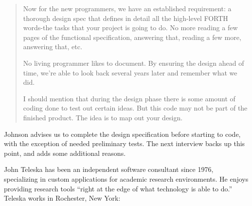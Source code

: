 \begin{quotation}
\noindent Now for the new programmers, we have an established requirement: a
thorough design spec that defines in detail all the high-level FORTH
words-the tasks that your project is going to do. No more reading a few
pages of the functional specification, answering that, reading a few more,
answering that, etc.

\noindent No living programmer likes to document. By ensuring the design ahead of
time, we're able to look back several years later and remember what we did.

\noindent I should mention that during the design phase there is some amount of
coding done to test out certain ideas. But this code may not be part of the
finished product. The idea is to map out your design.
\end{quotation}
\blackline{2ex}

\noindent Johnson advises us to complete the design specification before starting
to code, with the exception of needed preliminary tests. The next
interview backs up this point, and adds some additional reasons.

\blackline{2ex}
\noindent John Teleska has been an independent software consultant since 1976,
specializing in custom applications for academic research environments.
He enjoys providing research tools ``right at the edge of what technology
is able to do.'' Teleska works in Rochester, New York:

